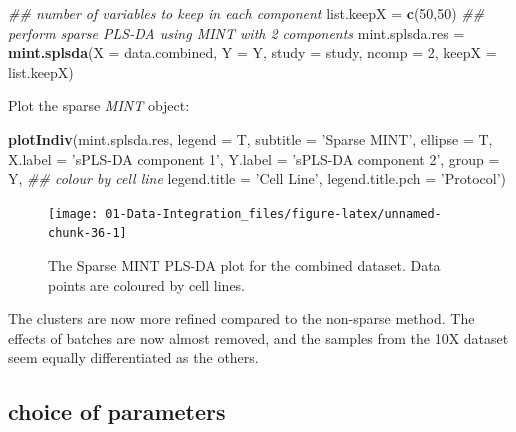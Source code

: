\documentclass[]{book}
\newenvironment{Shaded}{\begin{snugshade}}{\end{snugshade}}
\newcommand{\CommentTok}[1]{\textcolor[rgb]{0.56,0.35,0.01}{\textit{#1}}}
\newcommand{\DataTypeTok}[1]{\textcolor[rgb]{0.13,0.29,0.53}{#1}}
\newcommand{\DecValTok}[1]{\textcolor[rgb]{0.00,0.00,0.81}{#1}}
\newcommand{\KeywordTok}[1]{\textcolor[rgb]{0.13,0.29,0.53}{\textbf{#1}}}
\newcommand{\NormalTok}[1]{#1}
\newcommand{\StringTok}[1]{\textcolor[rgb]{0.31,0.60,0.02}{#1}}
\theoremstyle{definition}
\theoremstyle{definition}
\theoremstyle{definition}
\theoremstyle{remark}
\begin{document}
\begin{Shaded}
\begin{Highlighting}[]
\CommentTok{## number of variables to keep in each component}
\NormalTok{list.keepX =}\StringTok{ }\KeywordTok{c}\NormalTok{(}\DecValTok{50}\NormalTok{,}\DecValTok{50}\NormalTok{) }
\CommentTok{## perform sparse PLS-DA using MINT with 2 components}
\NormalTok{mint.splsda.res =}\StringTok{ }\KeywordTok{mint.splsda}\NormalTok{(}\DataTypeTok{X =}\NormalTok{ data.combined, }\DataTypeTok{Y =}\NormalTok{ Y,}
                              \DataTypeTok{study =}\NormalTok{ study, }\DataTypeTok{ncomp =} \DecValTok{2}\NormalTok{, }\DataTypeTok{keepX =}\NormalTok{ list.keepX)}
\end{Highlighting}
\end{Shaded}

Plot the sparse \emph{MINT} object:

\begin{Shaded}
\begin{Highlighting}[]
\KeywordTok{plotIndiv}\NormalTok{(mint.splsda.res,}
          \DataTypeTok{legend  =}\NormalTok{ T, }\DataTypeTok{subtitle =} \StringTok{'Sparse MINT'}\NormalTok{, }\DataTypeTok{ellipse =}\NormalTok{ T,}
          \DataTypeTok{X.label =} \StringTok{'sPLS-DA component 1'}\NormalTok{, }
          \DataTypeTok{Y.label =} \StringTok{'sPLS-DA component 2'}\NormalTok{,}
          \DataTypeTok{group =}\NormalTok{ Y, }\CommentTok{## colour by cell line}
          \DataTypeTok{legend.title =} \StringTok{'Cell Line'}\NormalTok{,}
          \DataTypeTok{legend.title.pch =} \StringTok{'Protocol'}\NormalTok{)}
\end{Highlighting}
\end{Shaded}

\begin{figure}[ht]

{\centering \texttt{[image: 01-Data-Integration\_files/figure-latex/unnamed-chunk-36-1]} 

}

\caption{The Sparse MINT PLS-DA plot for the combined dataset. Data points are coloured by cell lines.}\label{fig:unnamed-chunk-36}
\end{figure}

The clusters are now more refined compared to the non-sparse method. The
effects of batches are now almost removed, and the samples from the 10X
dataset seem equally differentiated as the others.

\hypertarget{choice-of-parameters}{%
\subsection{choice of parameters}\label{choice-of-parameters}}
\end{document}
